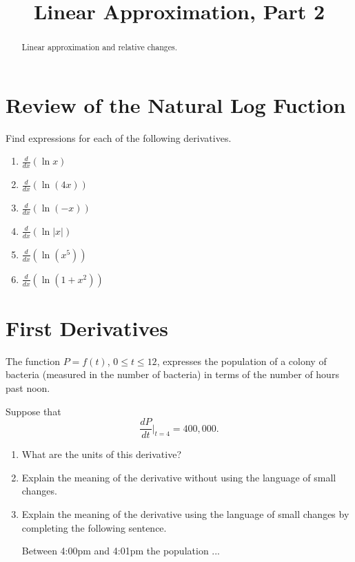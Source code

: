 \documentclass{ximera}
\title{Linear Approximation, Part 2}
\begin{document}
\begin{abstract}
Linear approximation and relative changes.
\end{abstract}
\maketitle


\section{Review of the Natural Log Fuction}

\begin{question} \label{QPodREERve3}
Find expressions for each of the following derivatives.

\begin{enumerate}
\item $\frac{d}{dx} \left( \ln x \right)$  

\item $\frac{d}{dx} \left( \ln (4x) \right)$ 

\item $\frac{d}{dx} \left( \ln (-x) \right)$ 

\item $\frac{d}{dx} \left( \ln |x| \right)$ 

\item $\frac{d}{dx} \left( \ln (x^5) \right)$ 

\item $\frac{d}{dx} \left( \ln (1+x^2) \right)$ 

\end{enumerate}

\end{question}


\section{First Derivatives}

\begin{question}  \label{Q5dfdgndfdfdfnhn}
The function $P=f(t)$, $0\leq t \leq 12$, expresses the population of a colony of bacteria (measured in the number of bacteria) in terms of the number of hours past noon.

Suppose that
\[
     \frac{dP}{dt}\Big|_{t=4} = 400,000.
\]

\begin{enumerate}
\item What are the units of this derivative?

\item Explain the meaning of the derivative without using the language of small changes.

\item Explain the meaning of the derivative using the language of small changes by completing the following sentence.

Between 4:00pm and 4:01pm the population ...
\end{enumerate}

\end{question}
\end{document}
